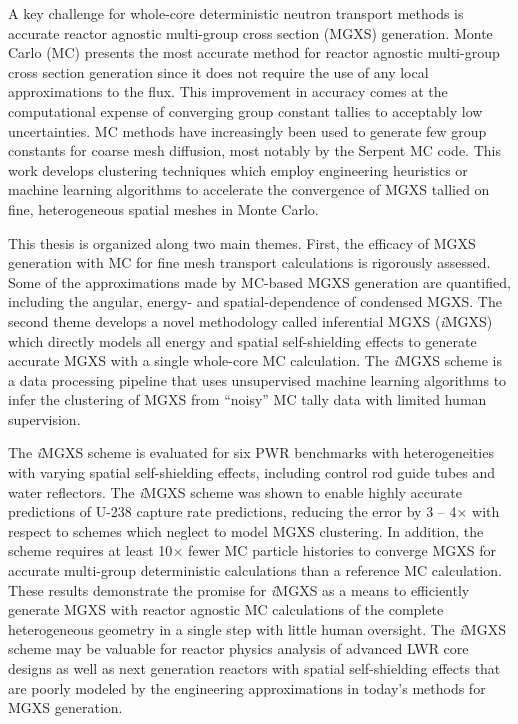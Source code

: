 \begin{abstractpage}

A key challenge for whole-core deterministic neutron transport methods is accurate reactor agnostic multi-group cross section (MGXS) generation. Monte Carlo (MC) presents the most accurate method for reactor agnostic multi-group cross section generation since it does not require the use of any local approximations to the flux. This improvement in accuracy comes at the computational expense of converging group constant tallies to acceptably low uncertainties. MC methods have increasingly been used to generate few group constants for coarse mesh diffusion, most notably by the Serpent MC code. This work develops clustering techniques which employ engineering heuristics or machine learning algorithms to accelerate the convergence of MGXS tallied on fine, heterogeneous spatial meshes in Monte Carlo.




This thesis is organized along two main themes. First, the efficacy of MGXS generation with MC for fine mesh transport calculations is rigorously assessed. Some of the approximations made by MC-based MGXS generation are quantified, including the angular, energy- and spatial-dependence of condensed MGXS. The second theme develops a novel methodology called inferential MGXS (\textit{i}MGXS) which directly models all energy and spatial self-shielding effects to generate accurate MGXS with a single whole-core MC calculation. The \textit{i}MGXS scheme is a data processing pipeline that uses unsupervised machine learning algorithms to infer the clustering of MGXS from ``noisy'' MC tally data with limited human supervision.

The \textit{i}MGXS scheme is evaluated for six PWR benchmarks with heterogeneities with varying spatial self-shielding effects, including control rod guide tubes and water reflectors. The \textit{i}MGXS scheme was shown to enable highly accurate predictions of U-238 capture rate predictions, reducing the error by 3 -- 4$\times$ with respect to schemes which neglect to model MGXS clustering. In addition, the scheme requires at least 10$\times$ fewer MC particle histories to converge MGXS for accurate multi-group deterministic calculations than a reference MC calculation. These results demonstrate the promise for \textit{i}MGXS as a means to efficiently generate MGXS with reactor agnostic MC calculations of the complete heterogeneous geometry in a single step with little human oversight. The \textit{i}MGXS scheme may be valuable for reactor physics analysis of advanced LWR core designs as well as next generation reactors with spatial self-shielding effects that are poorly modeled by the engineering approximations in today's methods for MGXS generation.


\end{abstractpage}
